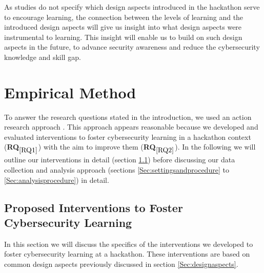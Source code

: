 \documentclass[runningheads]{llncs}
\newcommand{\hr}[1]{\textbf{RQ}$_{\ref{#1}}$}
\begin{document}
As studies do not specify which design aspects introduced in the hackathon serve to encourage learning, the connection between the levels of learning and the introduced design aspects will give us insight into what design aspects were instrumental to learning. This insight will enable us to build on such design aspects in the future, to advance security awareness and reduce the cybersecurity knowledge and skill gap.



\section{Empirical Method}
To answer the research questions stated in the introduction, we used an action research approach \cite{lewin1946action}. This approach appears reasonable because we developed and evaluated interventions to foster cybersecurity learning in a hackathon context (\hr{RQ1}) with the aim to improve them (\hr{RQ2}). In the following we will outline our interventions in detail (section \ref{Sec:interventions}) before discussing our data collection and analysis approach (sections \ref{Sec:settingsandprocedure} to \ref{Sec:analysisprocedure}) in detail.

\subsection{Proposed Interventions to Foster Cybersecurity Learning} \label{Sec:interventions}
In this section we will discuss the specifics of the interventions we developed to foster cybersecurity learning at a hackathon. These interventions are based on common design aspects previously discussed in section \ref{Sec:designaspects}.
\end{document}

